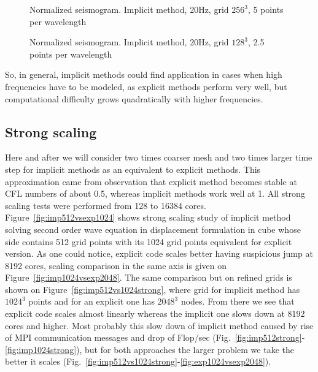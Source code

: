 \documentclass[12pt,a4paper]{report}
\begin{document}
\begin{figure}[h!]
\begin{minipage}[h!]{0.49\textwidth}
  	\caption{Normalized seismogram. Implicit method, 20Hz, grid $256^3$, 5 points per wavelength}
  	\label{fig:P20HZ5}
\end{minipage}
\hfill
\begin{minipage}[h!]{0.49\textwidth}
  	\caption{Normalized seismogram. Implicit method, 20Hz, grid $128^3$, 2.5 points per wavelength}
  	\label{fig:P20HZ25}
\end{minipage}
\end{figure}

So, in general, implicit methods could find application in cases when high frequencies have to be modeled, as explicit methods perform very well, but computational difficulty grows quadratically with higher frequencies.

\subsection*{Strong scaling}

Here and after we will consider two times coarser mesh and two times larger time step for implicit methods as an equivalent to explicit methods. This approximation came from observation that explicit method becomes stable at CFL numbers of about 0.5, whereas implicit methods work well at 1. All strong scaling tests were performed from 128 to 16384 cores.\\

Figure~\ref{fig:imp512vsexp1024} shows strong scaling study of implicit method solving second order wave equation in displacement formulation in cube whose side contains 512 grid points with its 1024 grid points equivalent for explicit version. As one could notice, explicit code scales better having suspicious jump at 8192 cores, scaling comparison in the same axis is given on Figure~\ref{fig:imp1024vsexp2048}. The same comparison but on refined grids is shown on Figure~\ref{fig:imp512vs1024strong}, where grid for implicit method has $1024^3$ points and for an explicit one has $2048^3$ nodes. From there we see that explicit code scales almost linearly whereas the implicit one slows down at 8192 cores and higher. Most probably this slow down of implicit method caused by rise of MPI communication messages and drop of Flop/sec (Fig.~\ref{fig:imp512strong}-\ref{fig:imp1024strong}), but for both approaches the larger problem we take the better it scales (Fig.~\ref{fig:imp512vs1024strong}-\ref{fig:exp1024vsexp2048}).
\end{document}
